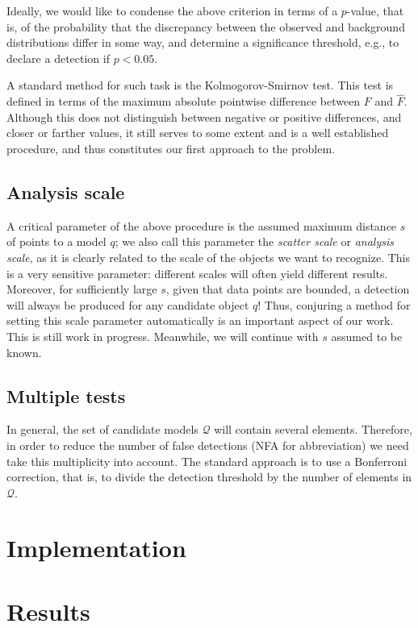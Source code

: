 \documentclass[a4page,11pt]{article}
\newcommand{\set}[1]{\mathcal{#1}}%
\begin{document}
Ideally, we would like to condense the above criterion in terms of a $p$-value, that is, of the probability that the discrepancy between the observed and background distributions differ in some way, and determine a significance threshold, e.g., to declare a detection if $p < 0.05$.

A standard method for such task is the Kolmogorov-Smirnov test. This test is defined in terms of the maximum absolute pointwise difference between $F$ and $\hat{F}$. Although this does not distinguish between negative or positive differences, and closer or farther values, it still serves to some extent and is a well established procedure, and thus constitutes our first approach to the problem.



\subsection{Analysis scale}

A critical parameter of the above procedure is the assumed maximum distance $s$ of points to a model $q$; we also call this parameter the \emph{scatter scale} or \emph{analysis scale}, as it is clearly related to the scale of the objects we want to recognize. This is a very sensitive parameter: different scales will often yield different results. Moreover, for sufficiently large $s$, given that data points are bounded, a detection will always be produced for any candidate object $q$! Thus, conjuring a method for setting this scale parameter automatically is an important aspect of our work. This is still work in progress. Meanwhile, we will continue with $s$ assumed to be known.

\subsection{Multiple tests}

In general, the set of candidate models $\set{Q}$ will contain several elements. Therefore, in order to reduce the number of false detections (NFA for abbreviation)  we need take this multiplicity into account. The standard approach is to use a Bonferroni correction, that is, to divide the detection threshold by the number of elements in $\set{Q}$.

\section{Implementation}

\section{Results}
\end{document}
